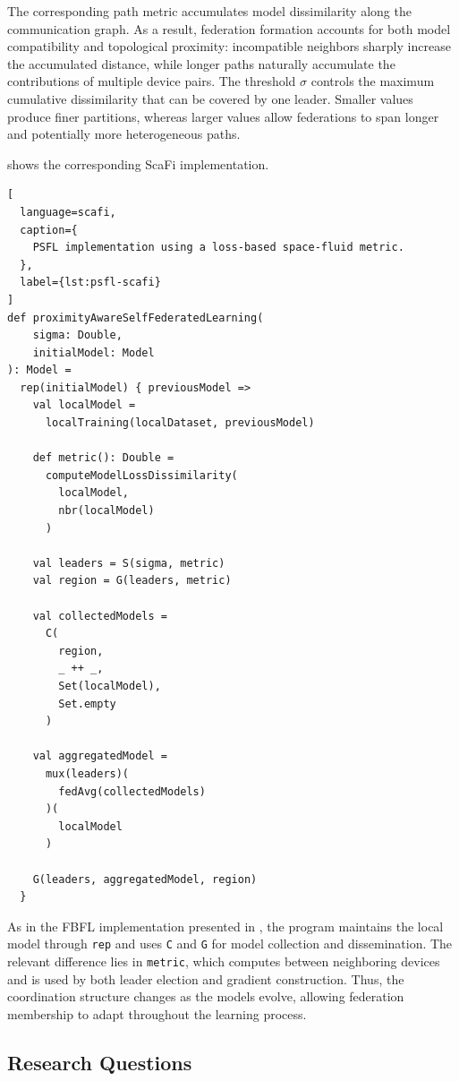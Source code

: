 The corresponding path metric accumulates model dissimilarity along the
communication graph.
%
As a result, federation formation accounts for both model compatibility and
topological proximity: incompatible neighbors sharply increase the accumulated
distance, while longer paths naturally accumulate the contributions of multiple
device pairs.
%
The threshold \(\sigma\) controls the maximum cumulative dissimilarity that can
be covered by one leader.
%
Smaller values produce finer partitions, whereas larger values allow
federations to span longer and potentially more heterogeneous paths.

 shows the corresponding ScaFi implementation.

\begin{lstlisting}[
  language=scafi,
  caption={
    PSFL implementation using a loss-based space-fluid metric.
  },
  label={lst:psfl-scafi}
]
def proximityAwareSelfFederatedLearning(
    sigma: Double,
    initialModel: Model
): Model =
  rep(initialModel) { previousModel =>
    val localModel =
      localTraining(localDataset, previousModel)

    def metric(): Double =
      computeModelLossDissimilarity(
        localModel,
        nbr(localModel)
      )

    val leaders = S(sigma, metric)
    val region = G(leaders, metric)

    val collectedModels =
      C(
        region,
        _ ++ _,
        Set(localModel),
        Set.empty
      )

    val aggregatedModel =
      mux(leaders)(
        fedAvg(collectedModels)
      )(
        localModel
      )

    G(leaders, aggregatedModel, region)
  }
\end{lstlisting}

As in the \gls{FBFL} implementation presented in
, the program maintains the local model through
\lstinline[language=scafi]|rep| and uses \texttt{C} and \texttt{G} for model
collection and dissemination.
%
The relevant difference lies in
\lstinline[language=scafi]|metric|, which computes
 between neighboring devices and is used by
both leader election and gradient construction.
%
Thus, the coordination structure changes as the models evolve, allowing
federation membership to adapt throughout the learning process.


\subsection{Research Questions}
\label{sec:psfl-research-questions}

